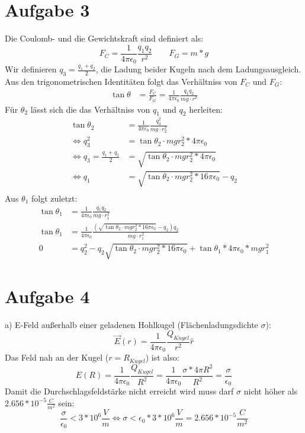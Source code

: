 \documentclass[a4paper]{article}
\newcommand{\kco}{\frac{1}{4\pi\epsilon_0}}
\begin{document}
\newpage
\setlength{\headheight}{0cm}
\section*{Aufgabe 3}
Die Coulomb- und die Gewichtskraft sind definiert als:
\[
	F_C = \kco \frac{q_1q_2}{r^2} \qquad F_G = m*g
\]
Wir definieren $q_3 = \frac{q_1 + q_2}{2} $, die Ladung  beider Kugeln nach dem Ladungsausgleich. Aus den trigonometrischen Identitäten folgt das Verhältniss von $F_C$ und $F_G$:
\begin{align*}
	\tan \theta &= \frac{F_C}{F_G} =  \kco \frac{q_1q_2}{mg \cdot r^2}
\end{align*}
Für $\theta_2$ lässt sich die das Verhältniss von $q_1$ und $q_2$ herleiten:
\begin{align*}
	\tan \theta_2 &= \kco \frac{q_3^2}{mg \cdot r_2^2} \\
	\Leftrightarrow
	q_3^2 &= \tan \theta_2 \cdot mg r_2^2 * 4\pi\epsilon_0 \\
	\Leftrightarrow
	q_3 = \frac{q_1 + q_2}{2} &= \sqrt{\tan \theta_2 \cdot mg r_2^2 * 4\pi\epsilon_0} \\
	\Leftrightarrow
	q_1 &= \sqrt{\tan \theta_2 \cdot mg r_2^2 * 16\pi\epsilon_0} - q_2 \\
\end{align*}
Aus $\theta_1$ folgt zuletzt:
\begin{align*}
	\tan \theta_1 &= \kco \frac{q_1q_2}{mg \cdot r_1^2} \\
	\tan \theta_1 &= \kco \frac{ \left( \sqrt{\tan \theta_2 \cdot mg r_2^2 * 16\pi\epsilon_0} - q_2 \right) q_2}{mg \cdot r_1^2} \\
	0 &= q_2^2 - q_2 \sqrt{\tan \theta_2 \cdot mg r_2^2 * 16\pi\epsilon_0}  + \tan \theta_1 * 4\pi\epsilon_0	*mg r_1^2 
\end{align*}


\section*{Aufgabe 4}
\par{a)}
E-Feld außerhalb einer geladenen Hohlkugel (Flächenladungsdichte $\sigma$):
\[ \vec E(r) = \kco \frac{Q_{Kugel}}{r^2} \hat r \]
Das Feld nah an der Kugel ($r = R_{Kugel}$) ist also:
\[
E(R) = \kco \frac{Q_{Kugel}}{R^2} = \kco \frac{\sigma * 4 \pi R^2}{R^2} = \frac \sigma {\epsilon_0}
\]
Damit die Durchschlagsfeldstärke nicht erreicht wird muss darf $\sigma$ nicht höher als $2.656 * 10^{-5} \frac{C}{m^2}$ sein:
\[
\frac \sigma {\epsilon_0} < 3 * 10^6 \frac V m
\Leftrightarrow
\sigma < \epsilon_0 * 3 * 10^6 \frac V m = 2.656 * 10^{-5} \frac{C}{m^2}
\]
\vspace{1cm}
\end{document}
